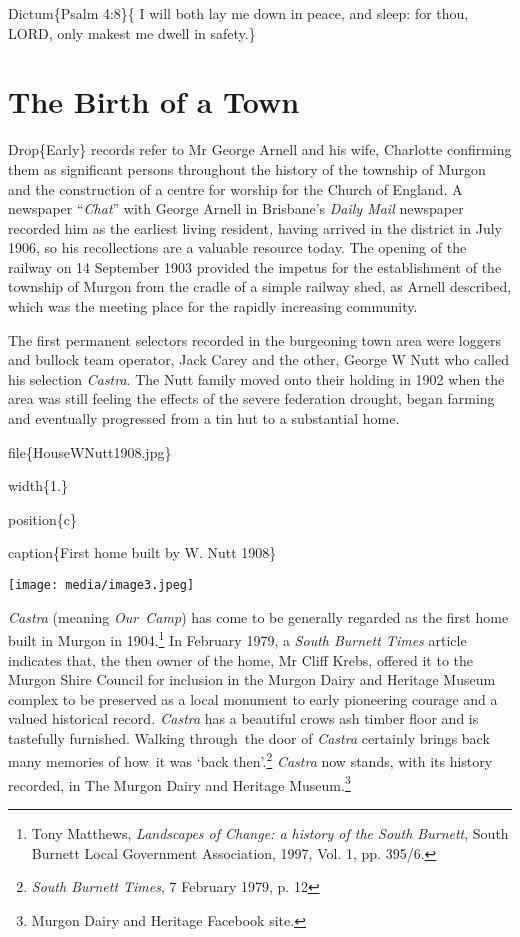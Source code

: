 Dictum\{Psalm 4:8\}\{ I will both lay me down in peace, and sleep: for thou, LORD, only makest me dwell in safety.\}

\hypertarget{the-birth-of-a-town}{%
\chapter{The Birth of a Town}\label{the-birth-of-a-town}}

Drop\{Early\} records refer to Mr George Arnell and his wife, Charlotte confirming them as significant persons throughout the history of the township of Murgon and the construction of a centre for worship for the Church of England. A newspaper ``\emph{Chat}'' with George Arnell in Brisbane's \emph{Daily Mail} newspaper recorded him as the earliest living resident\emph{,} having arrived in the district in July 1906, so his recollections are a valuable resource today. The opening of the railway on 14 September 1903 provided the impetus for the establishment of the township of Murgon from the cradle of a simple railway shed, as Arnell described, which was the meeting place for the rapidly increasing community.

The first permanent selectors recorded in the burgeoning town area were loggers and bullock team operator, Jack Carey and the other, George W Nutt who called his selection \emph{Castra}. The Nutt family moved onto their holding in 1902 when the area was still feeling the effects of the severe federation drought, began farming and eventually progressed from a tin hut to a substantial home.

file\{HouseWNutt1908.jpg\}

width\{1.\}

position\{c\}

caption\{First home built by W. Nutt 1908\}

\texttt{[image: media/image3.jpeg]}

\emph{Castra} (meaning \emph{Our~Camp}) has come to be generally regarded as the first home built in Murgon in 1904.\footnote{Tony Matthews, \emph{Landscapes of Change: a history of the South Burnett}, South Burnett Local Government Association, 1997, Vol. 1, pp. 395/6.} In February 1979, a \emph{South Burnett Times} article indicates that, the then owner of the home, Mr Cliff Krebs, offered it to the Murgon Shire Council for inclusion in the Murgon Dairy and Heritage Museum complex to be preserved as a local monument to early pioneering courage and a valued historical record\emph{. Castra} has a beautiful crows ash timber floor and is tastefully furnished. Walking through~the door of \emph{Castra} certainly brings back many memories of how~it was `back then'.\footnote{\emph{South Burnett Times}, 7 February 1979, p. 12} \emph{Castra} now stands, with its history recorded, in The Murgon Dairy and Heritage Museum.\footnote{Murgon Dairy and Heritage Facebook site.}

